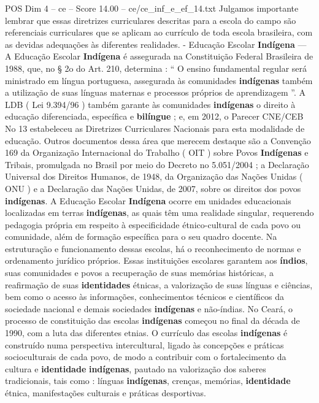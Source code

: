 \begin{textsample}{POS Dim 4 – ce – Score 14.00 – ce/ce\_inf\_e\_ef\_14.txt}
Julgamos importante lembrar que essas diretrizes curriculares descritas para a escola do campo são referenciais curriculares que se aplicam ao currículo de toda escola brasileira, com as devidas adequações às diferentes realidades. - Educação Escolar \textbf{Indígena} — A Educação Escolar \textbf{Indígena} é assegurada na Constituição Federal Brasileira de 1988, que, no § 2o do Art. 210, determina : “ O ensino fundamental regular será ministrado em língua portuguesa, assegurada às comunidades \textbf{indígenas} também a utilização de suas línguas maternas e processos próprios de aprendizagem ”.
A LDB ( Lei 9.394/96 ) também garante às comunidades \textbf{indígenas} o direito à educação diferenciada, específica e \textbf{bilíngue} ; e, em 2012, o Parecer CNE/CEB No 13 estabeleceu as Diretrizes Curriculares Nacionais para esta modalidade de educação.
Outros documentos dessa área que merecem destaque são a Convenção 169 da Organização Internacional do Trabalho ( OIT ) sobre Povos \textbf{Indígenas} e Tribais, promulgada no Brasil por meio do Decreto no 5.051/2004 ; a Declaração Universal dos Direitos Humanos, de 1948, da Organização das Nações Unidas ( ONU ) e a Declaração das Nações Unidas, de 2007, sobre os direitos dos povos \textbf{indígenas}.
A Educação Escolar \textbf{Indígena} ocorre em unidades educacionais localizadas em terras \textbf{indígenas}, as quais têm uma realidade singular, requerendo pedagogia própria em respeito à especificidade étnico-cultural de cada povo ou comunidade, além de formação específica para o seu quadro docente.
Na estruturação e funcionamento dessas escolas, há o reconhecimento de normas e ordenamento jurídico próprios.
Essas instituições escolares garantem aos \textbf{índios}, suas comunidades e povos a recuperação de suas memórias históricas, a reafirmação de suas \textbf{identidades} étnicas, a valorização de suas línguas e ciências, bem como o acesso às informações, conhecimentos técnicos e científicos da sociedade nacional e demais sociedades \textbf{indígenas} e não-índias.
No Ceará, o processo de constituição das escolas \textbf{indígenas} começou no final da década de 1990, com a luta das diferentes etnias.
O currículo das escolas \textbf{indígenas} é construído numa perspectiva intercultural, ligado às concepções e práticas socioculturais de cada povo, de modo a contribuir com o fortalecimento da cultura e \textbf{identidade} \textbf{indígenas}, pautado na valorização dos saberes tradicionais, tais como : línguas \textbf{indígenas}, crenças, memórias, \textbf{identidade} étnica, manifestações culturais e práticas desportivas.

\end{textsample}
